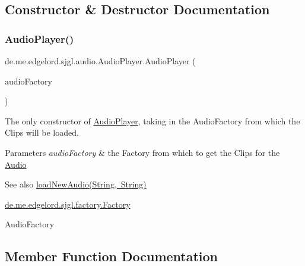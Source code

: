 \subsection{Constructor \& Destructor Documentation}
\mbox{\label{classde_1_1me_1_1edgelord_1_1sjgl_1_1audio_1_1_audio_player_aa2ce9d41080a96a25e09f9b0830e7b04}} 
\subsubsection{\texorpdfstring{Audio\+Player()}{AudioPlayer()}}
{\footnotesize\ttfamily de.\+me.\+edgelord.\+sjgl.\+audio.\+Audio\+Player.\+Audio\+Player (\begin{DoxyParamCaption}\item[{\mbox{\hyperlink{classde_1_1me_1_1edgelord_1_1sjgl_1_1factory_1_1_audio_factory}{Audio\+Factory}}}]{audio\+Factory }\end{DoxyParamCaption})}

The only constructor of \mbox{\hyperlink{classde_1_1me_1_1edgelord_1_1sjgl_1_1audio_1_1_audio_player}{Audio\+Player}}, taking in the {\ttfamily Audio\+Factory} from which the Clips will be loaded.


\begin{DoxyParams}{Parameters}
{\em audio\+Factory} & the {\ttfamily Factory from which to get the Clips for the \mbox{\hyperlink{classde_1_1me_1_1edgelord_1_1sjgl_1_1audio_1_1_audio}{Audio}}} \\
\hline
\end{DoxyParams}
\begin{DoxySeeAlso}{See also}
\mbox{\hyperlink{classde_1_1me_1_1edgelord_1_1sjgl_1_1audio_1_1_audio_player_a3fa42a34769a40aaf94c16e1589f7b09}{load\+New\+Audio(\+String, String)}} 

\mbox{\hyperlink{classde_1_1me_1_1edgelord_1_1sjgl_1_1factory_1_1_factory}{de.\+me.\+edgelord.\+sjgl.\+factory.\+Factory}} 

Audio\+Factory 
\end{DoxySeeAlso}


\subsection{Member Function Documentation}
\mbox{\label{classde_1_1me_1_1edgelord_1_1sjgl_1_1audio_1_1_audio_player_a3fa42a34769a40aaf94c16e1589f7b09}} 
